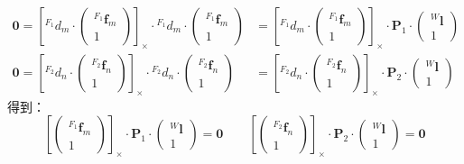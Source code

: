 \documentclass[12pt, onecolumn]{article}
\newcommand\liehat[1]{\left[ #1 \right]_\times}
\begin{document}
	\begin{equation}
	\begin{aligned}
	\boldsymbol{0}=\liehat{{^{F_1}d_m}\cdot\begin{pmatrix}{^{F_1}\boldsymbol{f}_m}\\1\end{pmatrix}}\cdot{^{F_1}d_m}\cdot\begin{pmatrix}{^{F_1}\boldsymbol{f}_m}\\1\end{pmatrix}&=\liehat{{^{F_1}d_m}\cdot\begin{pmatrix}{^{F_1}\boldsymbol{f}_m}\\1\end{pmatrix}}\cdot{\boldsymbol{P}_1}\cdot\begin{pmatrix}
	{^{W}\boldsymbol{l}}\\1
	\end{pmatrix}
	\\
	\boldsymbol{0}=\liehat{{^{F_2}d_n}\cdot\begin{pmatrix}{^{F_2}\boldsymbol{f}_n}\\1\end{pmatrix}}\cdot{^{F_2}d_n}\cdot\begin{pmatrix}{^{F_2}\boldsymbol{f}_n}\\1\end{pmatrix}&=\liehat{{^{F_2}d_n}\cdot\begin{pmatrix}{^{F_2}\boldsymbol{f}_n}\\1\end{pmatrix}}\cdot{\boldsymbol{P}_2}\cdot\begin{pmatrix}
	{^{W}\boldsymbol{l}}\\1
	\end{pmatrix}
	\end{aligned}
	\end{equation}
	得到：
	\begin{equation}
	\liehat{\begin{pmatrix}{^{F_1}\boldsymbol{f}_m}\\1\end{pmatrix}}\cdot{\boldsymbol{P}_1}\cdot\begin{pmatrix}
	{^{W}\boldsymbol{l}}\\1
	\end{pmatrix}=\boldsymbol{0}
	\qquad
	\liehat{\begin{pmatrix}{^{F_2}\boldsymbol{f}_n}\\1\end{pmatrix}}\cdot{\boldsymbol{P}_2}\cdot\begin{pmatrix}
	{^{W}\boldsymbol{l}}\\1
	\end{pmatrix}=\boldsymbol{0}
	\end{equation}
	
\end{document}
